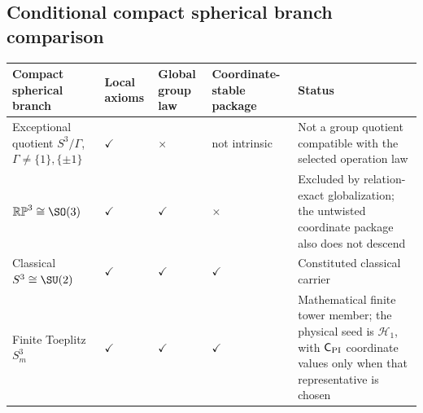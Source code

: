 \documentclass[11pt,a4paper]{article}
\begin{document}
\subsection{Conditional compact spherical branch comparison}
\label{p2b:app:compact-branch-comparison}
\begin{table}[ht]
\centering
\small
\begingroup
\setlength{\tabcolsep}{2.5pt}
\renewcommand{\arraystretch}{1.18}

\begin{tabular}{|
  L{3.2cm}|
  C{1.4cm}|
  C{2.0cm}|
  C{2.5cm}|
  L{\dimexpr\linewidth-3.2cm-1.4cm-2.0cm-2.5cm-10\arrayrulewidth\relax}|
}
\hline
\textbf{Compact spherical branch}
& \textbf{Local axioms}
& \textbf{Global group law}
& \textbf{Coordinate-stable package}
& \textbf{Status} \\
\hline

Exceptional quotient \(S^3/\Gamma\), \(\Gamma\neq \{1\},\{\pm1\}\)
& \(\checkmark\)
& \(\times\)
& not intrinsic
& Not a group quotient compatible with the selected operation law \\
\hline

\(\mathbb{RP}^3\cong \SO(3)\)
& \(\checkmark\)
& \(\checkmark\)
& \(\times\)
& Excluded by relation-exact globalization; the untwisted coordinate package
also does not descend \\
\hline

Classical \(S^3\cong \SU(2)\)
& \(\checkmark\)
& \(\checkmark\)
& \(\checkmark\)
& Constituted classical carrier \\
\hline

Finite Toeplitz \(S^3_m\)
& \(\checkmark\)
& \(\checkmark\)
& \(\checkmark\)
& Mathematical finite tower member; the physical seed is \(\mathcal H_1\),
with \(\mathsf C_{\rm PI}\) coordinate values only when that representative is chosen \\
\hline

\end{tabular}


\end{table}
\end{document}
